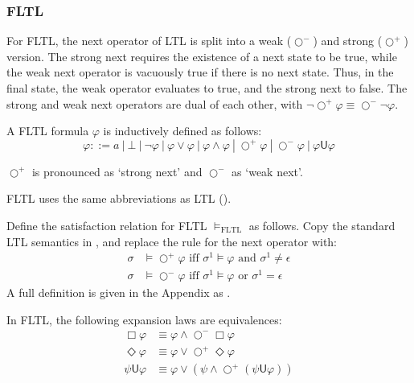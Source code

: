 \documentclass[a4paper]{article}
\newcommand{\U}{\mathsf{U}}
\newcommand{\tand}{\text{ and }}
\newcommand{\tor}{\text{ or }}
\newcommand{\tiff}{\text{ iff }}
\newcommand{\sn}{\bigcirc^+}
\newcommand{\wn}{\bigcirc^-}
\begin{document}
\subsubsection{FLTL} For FLTL, the next operator of LTL is split into a weak ($\wn$) and strong ($\sn$) version.
The strong next requires the existence of a next state to be true, while the weak next operator is vacuously true if there is no next state.
Thus, in the final state, the weak operator evaluates to true, and the strong next to false. The strong and weak next operators are dual of each other, with  $\neg\sn\varphi \equiv \wn\neg\varphi$.

\begin{defn}\label{fltlsyn}

  A FLTL formula $\varphi$ is inductively defined as follows:
  \[\varphi ::= a ~|~ \bot ~|~ \neg \varphi ~|~\varphi \lor \varphi ~|~ \varphi \land \varphi ~|~ \sn \varphi ~|~ \wn \varphi ~|~ \varphi \U\varphi\]

  $\sn$ is pronounced as `strong next' and $\wn$ as `weak next'.
\end{defn}

  FLTL uses the same abbreviations as LTL ().

\begin{defn}\label{fltlsem}

  Define the satisfaction relation for FLTL $\vDash_{\text{FLTL}}$ as follows.
  Copy the standard LTL semantics in , and replace the rule for the next operator with:
  \begin{align*}
    \sigma&\vDash\sn\varphi \tiff \sigma^1\vDash\varphi \tand \sigma^1 \neq \epsilon\\
    \sigma&\vDash\wn\varphi \tiff \sigma^1\vDash\varphi \tor \sigma^1 = \epsilon
  \end{align*}
  A full definition is given in the Appendix as .
\end{defn}


\begin{lem}\label{fltlexp}

  In FLTL, the following expansion laws are equivalences:
  \begin{align}
    \Box \varphi &\equiv \varphi \land \wn \Box \varphi \label{felBox}\\
    \Diamond \varphi &\equiv \varphi \lor \sn \Diamond \varphi\label{felDiamond}\\
    \psi \U \varphi &\equiv \varphi \lor (\psi \land \sn (\psi \U \varphi))\label{felU}
  \end{align}

\end{lem}
\end{document}

